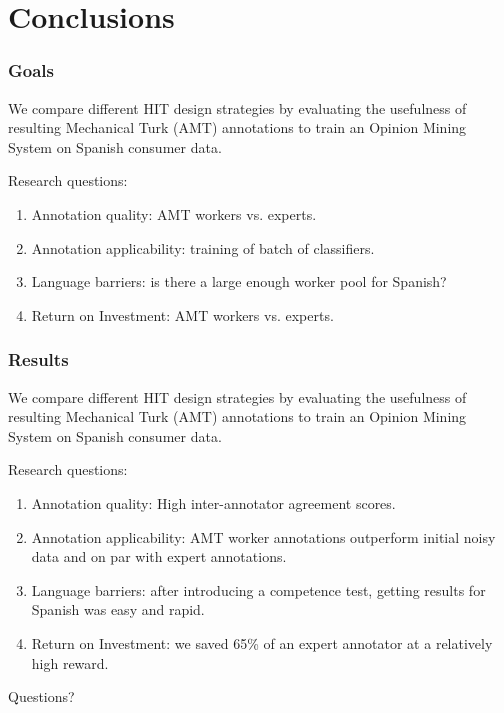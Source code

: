\documentclass[10pt]{beamer}
\begin{document}
\section{Conclusions}

\begin{frame}
  \frametitle{Goals}
We compare different HIT design strategies by evaluating the usefulness of resulting Mechanical Turk (AMT) annotations to train an Opinion Mining System on Spanish consumer data.\\

\vspace{1cm}

\begin{block}{Research questions:}
 \begin{enumerate}
 \item Annotation quality: AMT workers vs. experts.
 \item Annotation applicability: training of batch of classifiers.
 \item Language barriers: is there a large enough worker pool for Spanish?
 \item Return on Investment: AMT workers vs. experts.
\end{enumerate}
\end{block}
\end{frame}

\begin{frame}
  \frametitle{Results}
We compare different HIT design strategies by evaluating the usefulness of resulting Mechanical Turk (AMT) annotations to train an Opinion Mining System on Spanish consumer data.\\

\vspace{1cm}

\begin{block}{Research questions:}
 \begin{enumerate}
 \item Annotation quality: High inter-annotator agreement scores.
 \item Annotation applicability: AMT worker annotations outperform initial noisy data and on par with expert annotations.
 \item Language barriers: after introducing a competence test, getting results for Spanish was easy and rapid.
 \item Return on Investment: we saved 65\% of an expert annotator at a relatively high reward.
\end{enumerate}
\end{block}
\end{frame}

\begin{frame}
\vspace{3cm}
\begin{center}
  \begin{Large}Questions?\end{Large}
\end{center}
\vspace{2.3cm}\hspace{8.5cm}
\end{frame}
\end{document}
